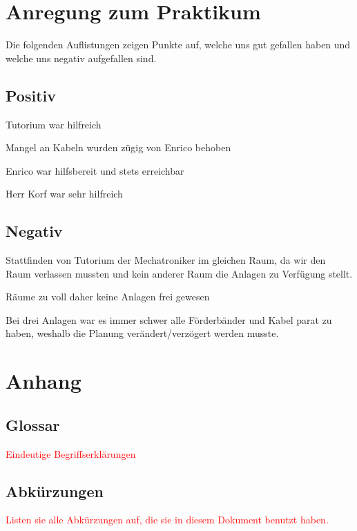 \documentclass[a4paper, 11pt]{article}
\begin{document}
\section{Anregung zum Praktikum}
Die folgenden Auflistungen zeigen Punkte auf, welche uns gut gefallen haben und welche uns negativ aufgefallen sind.

\subsection{Positiv}
\begin{compactenum}[$\bullet$]
\item Tutorium war hilfreich
\medskip
\item Mangel an Kabeln wurden zügig von Enrico behoben
\medskip
\item Enrico war hilfsbereit und stets erreichbar
\medskip
\item Herr Korf war sehr hilfreich
\end{compactenum}

\subsection{Negativ}
\begin{compactenum}[$\bullet$]
\item Stattfinden von Tutorium der Mechatroniker im gleichen Raum, da wir den Raum verlassen mussten und kein anderer Raum die Anlagen zu Verfügung stellt.
\medskip
\item Räume zu voll daher keine Anlagen frei gewesen
\medskip
\item Bei drei Anlagen war es immer schwer alle Förderbänder und Kabel parat zu haben, weshalb die Planung verändert/verzögert werden musste.
\end{compactenum}

\section{Anhang}

\subsection{Glossar}
\textcolor{red}{Eindeutige Begriffserklärungen}

\subsection{Abkürzungen}
\textcolor{red}{Listen sie alle Abkürzungen auf, die sie in diesem Dokument benutzt haben.}
\end{document}
